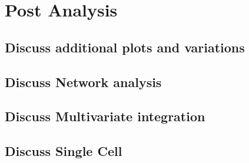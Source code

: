 \documentclass[
]{book}
\begin{document}
\hypertarget{post-analysis}{%
\chapter{Post Analysis}\label{post-analysis}}

\hypertarget{discuss-additional-plots-and-variations}{%
\section{Discuss additional plots and variations}\label{discuss-additional-plots-and-variations}}

\hypertarget{discuss-network-analysis}{%
\section{Discuss Network analysis}\label{discuss-network-analysis}}

\hypertarget{discuss-multivariate-integration}{%
\section{Discuss Multivariate integration}\label{discuss-multivariate-integration}}

\hypertarget{discuss-single-cell}{%
\section{Discuss Single Cell}\label{discuss-single-cell}}

  
\end{document}
